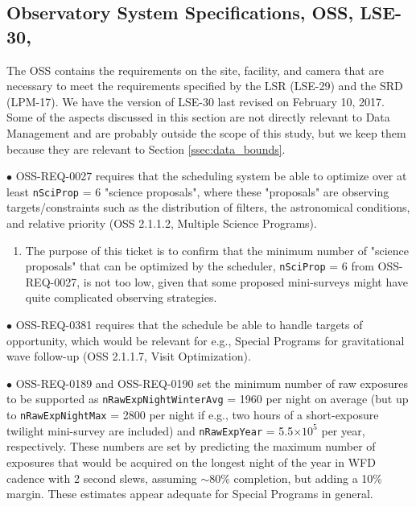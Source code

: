 \documentclass[DM,lsstdraft,toc]{lsstdoc}
\begin{document}
\subsection{Observatory System Specifications, OSS, LSE-30, \cite{LSE-30}}\label{ssec:docrev_oss}

The OSS contains the requirements on the site, facility, and camera that are necessary to meet the requirements specified by the LSR (LSE-29) and the SRD (LPM-17). We have the version of LSE-30 last revised on February 10, 2017. Some of the aspects discussed in this section are not directly relevant to Data Management and are probably outside the scope of this study, but we keep them because they are relevant to Section \ref{ssec:data_bounds}. 

$\bullet$ OSS-REQ-0027 requires that the scheduling system be able to optimize over at least {\tt nSciProp} = 6 "science proposals", where these "proposals" are observing targets/constraints such as the distribution of filters, the astronomical conditions, and relative priority (OSS 2.1.1.2, Multiple Science Programs). 
\begin{enumerate}[resume,topsep=-10pt,after=\vspace{10pt},label= \textbf{Action \Roman*}] \item \label{OSS-1} The purpose of this ticket is to confirm that the minimum number of "science proposals" that can be optimized by the scheduler, {\tt nSciProp} = 6 from OSS-REQ-0027, is not too low, given that some proposed mini-surveys might have quite complicated observing strategies. \end{enumerate} %

$\bullet$ OSS-REQ-0381 requires that the schedule be able to handle targets of opportunity, which would be relevant for e.g., Special Programs for gravitational wave follow-up (OSS 2.1.1.7, Visit Optimization).

$\bullet$ OSS-REQ-0189 and OSS-REQ-0190 set the minimum number of raw exposures to be supported as {\tt nRawExpNightWinterAvg} = 1960 per night on average (but up to {\tt nRawExpNightMax} = 2800 per night if e.g., two hours of a short-exposure twilight mini-survey are included) and {\tt nRawExpYear} = 5.5$\times10^5$ per year, respectively. These numbers are set by predicting the maximum number of exposures that would be acquired on the longest night of the year in WFD cadence with 2 second slews, assuming $\sim80\%$ completion, but adding a 10\% margin. These estimates appear adequate for Special Programs in general.
\end{document}

